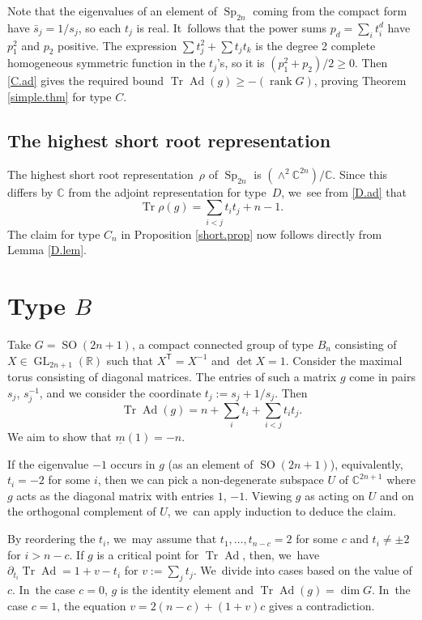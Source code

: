 \documentclass[JEP,XML,SOM,Unicode,NoFloatCountersInSection,published]{cedram}
\theoremstyle{definition}
\newcommand{\trans}{\mathsf{T}}
\newcommand{\R}{\mathbb{R}}
\newcommand{\C}{\mathbb{C}}
\newcommand{\mmin}{\underline{m}}
\DeclareMathOperator{\GL}{GL}
\DeclareMathOperator{\Sp}{Sp}
\DeclareMathOperator{\SO}{SO}
\DeclareMathOperator{\Tr}{Tr}
\DeclareMathOperator{\Ad}{Ad}
\DeclareMathOperator{\rank}{rank}
\begin{document}
Note that the eigenvalues of an element of $\Sp_{2n}$ coming from the compact form have $\bar{s}_j = 1/s_j$, so each $t_j$ is real. It~follows that the power sums $p_d = \sum_i t_i^d$ have $p_1^2$ and $p_2$ positive. The expression
$\sum t_j^2 + \sum t_j t_k$ is the degree 2 complete homogeneous symmetric function in the $t_j$'s, so it is $(p_1^2 + p_2)/2 \ge 0$. Then \eqref{C.ad} gives the required bound $\Tr \Ad(g) \ge -(\rank G)$, proving Theorem \ref{simple.thm} for type $C$.

\subsection*{The highest short root representation}
The highest short root representation~$\rho$ of $\Sp_{2n}$ is $(\wedge^2 \C^{2n}) / \C$. Since this differs by $\C$ from the adjoint representation for type~$D$, we~see from \eqref{D.ad} that
\begin{equation} \label{C.rho}
\Tr \rho(g) = \sum_{i < j} t_i t_j + n - 1.
\end{equation}
The claim for type $C_n$ in Proposition \ref{short.prop} now follows directly from Lemma \ref{D.lem}.

\section{Type \texorpdfstring{$B$}{B}} \label{B.sec}

Take $G = \SO(2n+1)$, a compact connected group of type $B_n$ consisting of $X \in \GL_{2n+1}(\R)$ such that $X^\trans = X^{-1}$ and $\det X = 1$.
Consider the maximal torus consisting of diagonal matrices. The entries of such a matrix $g$ come in pairs $s_j$, $s_j^{-1}$, and we consider the coordinate $t_j := s_j + 1/s_j$. Then
\begin{equation} \label{B.ad}
\Tr \Ad(g) = n + \sum_i t_i + \sum_{i<j} t_i t_j.
\end{equation}
We aim to show that $\mmin(1) = -n$.

If the eigenvalue $-1$ occurs in $g$ (as an element of $\SO(2n+1)$), equivalently, $t_i = -2$ for some $i$, then we can pick a non-degenerate subspace $U$ of $\C^{2n+1}$ where $g$ acts as the diagonal matrix with entries $1$, $-1$. Viewing $g$ as acting on $U$ and on the orthogonal complement of $U$, we~can apply induction to deduce the claim.

By reordering the $t_i$, we~may assume that $t_1, \ldots, t_{n-c} = 2$ for some $c$ and $t_i \ne \pm 2$ for $i > n-c$. If $g$ is a critical point for $\Tr \Ad$, then, we~have $\partial_{t_i} \Tr \Ad = 1 + v - t_i$ for
$v := \sum_j t_j$. We~divide into cases based on the value of $c$. In~the case $c = 0$, $g$ is the identity element and $\Tr \Ad(g) = \dim G$. In~the case $c = 1$, the equation $v = 2(n-c) + (1+v)c$ gives a contradiction.
\end{document}
